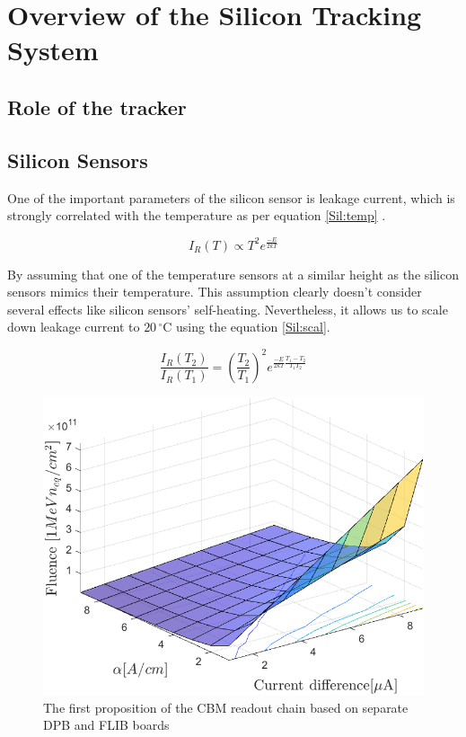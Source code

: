 
\section{Overview of the Silicon Tracking System}
\subsection{Role of the tracker}
\subsection{Silicon Sensors}
\label{sensors}
One of the important parameters of the silicon sensor is leakage current, which is strongly correlated with the temperature as per equation \ref{Sil:temp} \cite{Hartmann:2017gzy}.

\begin{equation}
\label{Sil:temp}
    I_{R}(T) \propto T^{2}e^{\frac{-E}{2kT}}
\end{equation}

 By assuming that one of the  temperature sensors at a similar height as the silicon sensors mimics their temperature. This assumption clearly doesn't consider several effects like silicon sensors' self-heating. Nevertheless, it allows us to scale down leakage current to $20\,^{\circ}$C using the equation \ref{Sil:scal}.
 
\begin{equation}
\label{Sil:scal}
    \frac{I_{R}(T_{2})}{I_{R}(T_{1})} = (\frac{T_{2}}{T_{1}})^{2}e^{\frac{-E}{2kT}\frac{T_{1}-T_{2}}{T_{1}T_{2}}}
\end{equation}

\begin{figure}[!h]
\centering
\includegraphics[width=0.65\columnwidth]{Chapter2/images/Leakage_current.png}
\caption{The first proposition of the CBM readout chain based on separate DPB and FLIB boards \cite{CRI}}
\label{fig_leakage}
\end{figure}

